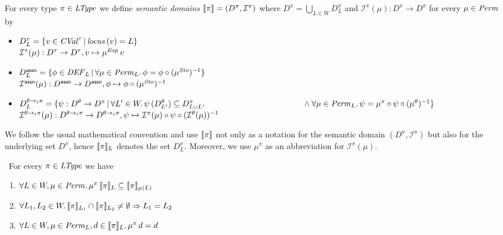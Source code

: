 \documentclass[12pt,a4paper]{report}
\newcommand{\CVal}{\nstyle{CVal}}
\newcommand{\Sto}{\nstyle{Sto}}
\newcommand{\DEF}{\nstyle{DEF}}
\newcommand{\I}{\mathcal{I}}
\begin{document}
\begin{definition}
  For every type $\pi\in\mathit{LType}$ we define {\em semantic domains} $\semantic{\pi} = (D^\pi,\I^\pi)$ where
  $D^\pi = \bigcup_{L \in W} D^\pi_L$ and $\I^\pi(\mu) : D^\pi \to D^\pi$ for every $\mu \in \mathit{Perm}$ by
  \begin{itemize}
    \item $D^\tau_L = \{v\in\CVal^\tau\,|\,\locns{v} = L\}$ \\
          $\I^\tau(\mu): D^\tau \to D^\tau, v \mapsto \mu^\Exp\,v$

    \item $D^\tassn_L = \{ \phi\in\DEF_L\,|\,\forall \mu\in\Perm_L.\,\phi = \phi \circ (\mu^\Sto)^{-1}\}$ \\
          $\I^\tassn(\mu): D^\tassn \to D^\tassn, \phi \mapsto \phi \circ (\mu^\Sto)^{-1}$

    \item $D^{\ttarrow{\theta}{\pi}}_L = \{ \psi: D^\theta \to D^\pi\,|\,
                          \forall L'\in W.\,\psi\,(D^\theta_{L'}) \subseteq D^\pi_{L \cup L'} \\
                          \hspace*{4.2cm} \wedge \forall \mu\in\Perm_L.\,\psi=\mu^\pi\circ\psi\circ(\mu^\theta)^{-1}\}$\\
          $\I^{\ttarrow{\theta}{\pi}}(\mu): D^{\ttarrow{\theta}{\pi}} \to D^{\ttarrow{\theta}{\pi}},
                                            \psi \mapsto \I^\pi(\mu) \circ \psi \circ (\I^\theta(\mu))^{-1}$
  \end{itemize}
\end{definition}

We follow the usual mathematical convention and use $\llbracket\pi\rrbracket$ not only as a notation
for the semantic domain $(D^\pi,\I^\pi)$ but also for the underlying set $D^\pi$,
hence $\llbracket\pi\rrbracket_L$ denotes the set $D^\pi_L$. Moreover, we use $\mu^\pi$ as an abbreviation
for $\I^\pi(\mu)$.

\begin{lemma} \
  For every $\pi \in \mathit{LType}$ we have
  \begin{enumerate}
    \item $\forall L\in W, \mu \in \mathit{Perm}.\,\mu^\pi\,\llbracket\pi\rrbracket_L \subseteq \llbracket\pi\rrbracket_{\mu(L)}$
    \item $\forall L_1,L_2 \in W.\, \llbracket\pi\rrbracket_{L_1} \cap \llbracket\pi\rrbracket_{L_2} \ne \emptyset \Rightarrow L_1=L_2$
    \item $\forall L \in W, \mu \in \mathit{Perm}_L, d\in \llbracket\pi\rrbracket_L.\, \mu^\pi\,d = d$
  \end{enumerate}
\end{lemma}
\end{document}
